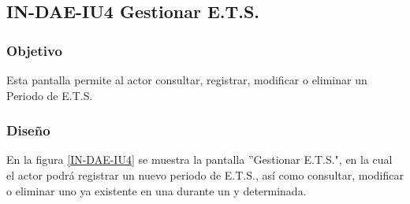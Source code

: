\subsection{IN-DAE-IU4 Gestionar E.T.S.}

\subsubsection{Objetivo}
	
	Esta pantalla permite al actor consultar, registrar, modificar o eliminar un Periodo de E.T.S.

\subsubsection{Diseño}

    En la figura \ref{IN-DAE-IU4} se muestra la pantalla ''Gestionar E.T.S.", en la cual el actor podrá registrar un nuevo periodo de E.T.S., así como consultar, modificar o eliminar uno ya existente en una  durante un  y  determinada.
            
